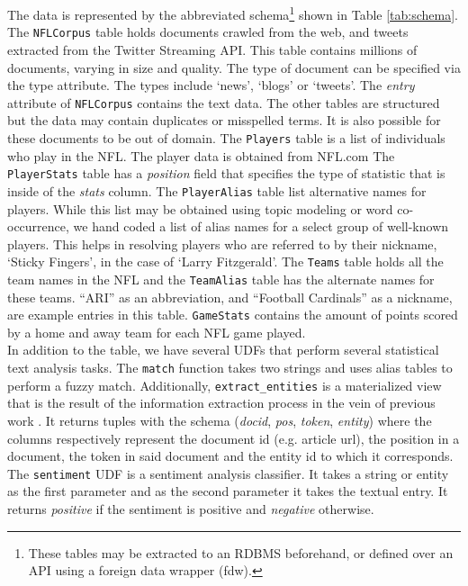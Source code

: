 The data is represented by the abbreviated schema\footnote{These tables may be
extracted to an RDBMS beforehand, or defined over an API
using a foreign data wrapper (fdw).} shown in Table \ref{tab:schema}.
The {\tt NFLCorpus} table holds documents crawled from the web,
and tweets extracted from the Twitter Streaming API. This table contains
millions of documents, varying in size and quality. The type of document 
can be specified via the type attribute. The types include `news', `blogs' or
`tweets'. The \textit{entry} attribute of {\tt NFLCorpus} contains the text data.
The other tables are structured but the data may contain duplicates or
misspelled terms. It is also possible for these documents to be out of domain.
The {\tt Players} table is a list of individuals
who play in the NFL. The player data is obtained from NFL.com
The {\tt PlayerStats} table has a \textit{position} field that specifies
the type of statistic that is inside of the \textit{stats} column.
The {\tt PlayerAlias} table list alternative names for players.
While this list may be obtained using topic modeling or word
co-occurrence, we hand coded a list of alias names for a select
group of well-known players. This helps in resolving players who are
referred to by their nickname, `Sticky Fingers', in the case of
`Larry Fitzgerald'.
The {\tt Teams} table holds all the team
names in the NFL and the {\tt TeamAlias} table has the alternate names for these
teams. ``ARI'' as an abbreviation,  and ``Football Cardinals'' as a nickname, are 
example entries in this table. {\tt GameStats} contains the amount of points scored by a 
home and away team for each NFL game played.\\


In addition to the table, we have several UDFs that perform several statistical
text analysis tasks. The {\tt match} function takes two strings and
uses alias tables to perform a fuzzy match.
Additionally, {\tt extract\_entities} is a materialized view that is the
result of the information extraction process in the vein of previous work
\cite{wang2010probabilistic}.
It returns tuples with the schema
(\textit{docid}, \textit{pos}, \textit{token}, \textit{entity}) where the
columns respectively represent
the document id (e.g. article url), the position in a document, the token
in said document and the entity id to which it corresponds.
The {\tt sentiment} UDF is a sentiment analysis classifier.
It takes a string or entity as the first parameter and as the second parameter
it takes the textual entry. It returns \textit{positive} if the sentiment is
positive and \textit{negative} otherwise.

